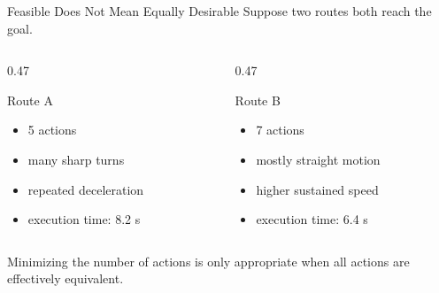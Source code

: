 \documentclass[aspectratio=169,10pt]{beamer}
\begin{document}
\begin{frame}[shrink=20]{Feasible Does Not Mean Equally Desirable}
  Suppose two routes both reach the goal.

  \begin{columns}[T,onlytextwidth]
    \begin{column}{0.47\textwidth}
      \begin{block}{Route A}
        \begin{itemize}
          \item 5 actions
          \item many sharp turns
          \item repeated deceleration
          \item execution time: 8.2 s
        \end{itemize}
      \end{block}
    \end{column}

    \begin{column}{0.47\textwidth}
      \begin{block}{Route B}
        \begin{itemize}
          \item 7 actions
          \item mostly straight motion
          \item higher sustained speed
          \item execution time: 6.4 s
        \end{itemize}
      \end{block}
    \end{column}
  \end{columns}

  \begin{keyidea}
    Minimizing the number of actions is only appropriate when all actions are effectively equivalent.
  \end{keyidea}
\end{frame}
\end{document}
